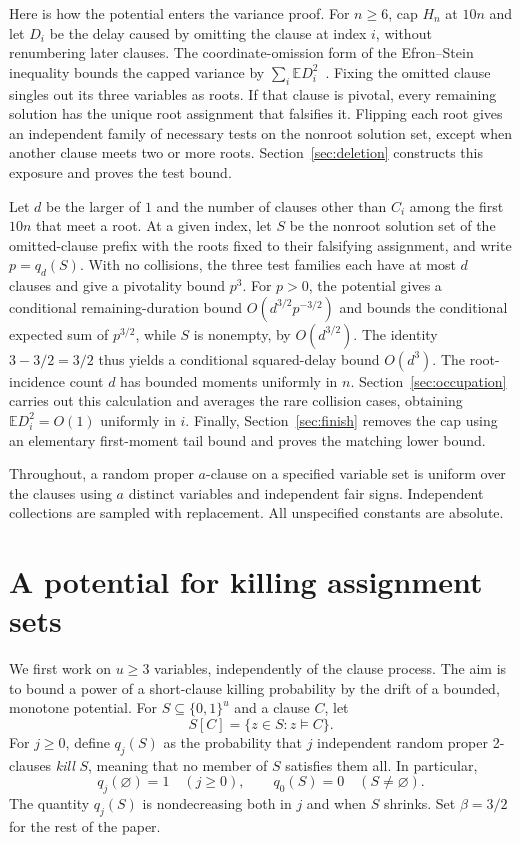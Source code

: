 \documentclass[11pt]{article}
\theoremstyle{remark}
\newcommand{\E}{\mathbb E}
\numberwithin{equation}{section}
\begin{document}
Here is how the potential enters the variance proof. For $n\ge6$, cap $H_n$ at $10n$
and let $D_i$ be the delay caused by omitting the clause at index $i$,
without renumbering later clauses. The coordinate-omission form of the
Efron--Stein inequality bounds the capped variance by
$\sum_i\E D_i^2$~\cite{EfronStein1981,BBLM2005}. Fixing the omitted clause
singles out its three variables as roots. If that clause is pivotal,
every remaining solution has the unique root assignment that falsifies it.
Flipping each root gives an independent family of necessary tests on the
nonroot solution set, except when another clause meets two or more roots.
Section~\ref{sec:deletion} constructs this exposure and proves the test bound.

Let $d$ be the larger of $1$ and the number of clauses other than $C_i$
among the first $10n$ that meet a root. At a given index, let $S$ be
the nonroot solution set of the omitted-clause prefix with the roots
fixed to their falsifying assignment, and write $p=q_d(S)$.
With no collisions, the three test
families each have at most $d$ clauses and give a pivotality bound $p^3$.
For $p>0$, the potential gives a conditional remaining-duration bound
$O(d^{3/2}p^{-3/2})$ and bounds the conditional expected sum of $p^{3/2}$,
while $S$ is nonempty, by $O(d^{3/2})$.
The identity $3-3/2=3/2$ thus yields a
conditional squared-delay bound $O(d^3)$. The root-incidence count $d$
has bounded moments uniformly in $n$. Section~\ref{sec:occupation}
carries out this calculation and averages the rare collision cases,
obtaining $\E D_i^2=O(1)$ uniformly in $i$.
Finally, Section~\ref{sec:finish} removes the cap using an elementary
first-moment tail bound and proves the matching lower bound.

Throughout, a random proper $a$-clause on a specified variable set is
uniform over the clauses using $a$ distinct variables and independent
fair signs. Independent collections are sampled with replacement.
All unspecified constants are absolute.

\section{A potential for killing assignment sets}
\label{sec:potential}

We first work on $u\ge3$ variables, independently of the clause process.
The aim is to bound a power of a short-clause killing probability by
the drift of a bounded, monotone potential.
For $S\subseteq\{0,1\}^u$ and a clause $C$, let
\[
 S[C]=\{z\in S:z\models C\}.
\]
For $j\ge0$, define $q_j(S)$ as the probability that $j$ independent
random proper 2-clauses \emph{kill} $S$, meaning that no member of $S$
satisfies them all. In particular,
\[
 q_j(\varnothing)=1\quad(j\ge0),\qquad
 q_0(S)=0\quad(S\ne\varnothing).
\]
The quantity $q_j(S)$ is nondecreasing both in $j$ and when $S$ shrinks.
Set $\beta=3/2$ for the rest of the paper.
\end{document}
